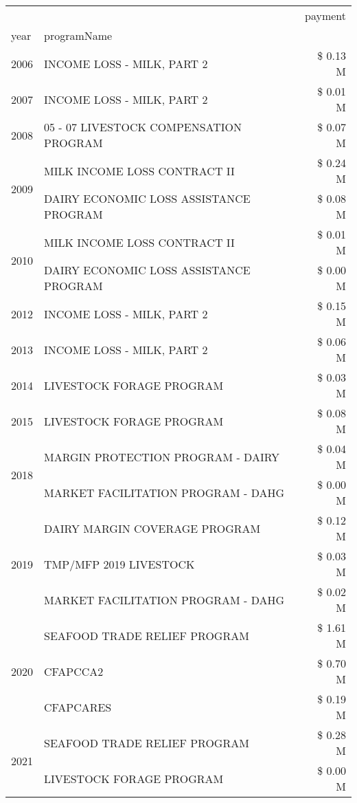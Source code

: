 \begin{tabular}{llr}
\toprule
 &  & payment \\
year & programName &  \\
\midrule
2006 & INCOME LOSS - MILK, PART 2 & \$ 0.13 M \\
\cline{1-3}
2007 & INCOME LOSS - MILK, PART 2 & \$ 0.01 M \\
\cline{1-3}
2008 & 05 - 07 LIVESTOCK COMPENSATION PROGRAM & \$ 0.07 M \\
\cline{1-3}
\multirow[t]{2}{*}{2009} & MILK INCOME LOSS CONTRACT II & \$ 0.24 M \\
 & DAIRY ECONOMIC LOSS ASSISTANCE PROGRAM & \$ 0.08 M \\
\cline{1-3}
\multirow[t]{2}{*}{2010} & MILK INCOME LOSS CONTRACT II & \$ 0.01 M \\
 & DAIRY ECONOMIC LOSS ASSISTANCE PROGRAM & \$ 0.00 M \\
\cline{1-3}
2012 & INCOME LOSS - MILK, PART 2 & \$ 0.15 M \\
\cline{1-3}
2013 & INCOME LOSS - MILK, PART 2 & \$ 0.06 M \\
\cline{1-3}
2014 & LIVESTOCK FORAGE PROGRAM & \$ 0.03 M \\
\cline{1-3}
2015 & LIVESTOCK FORAGE PROGRAM & \$ 0.08 M \\
\cline{1-3}
\multirow[t]{2}{*}{2018} & MARGIN PROTECTION PROGRAM - DAIRY & \$ 0.04 M \\
 & MARKET FACILITATION PROGRAM - DAHG & \$ 0.00 M \\
\cline{1-3}
\multirow[t]{3}{*}{2019} & DAIRY MARGIN COVERAGE PROGRAM & \$ 0.12 M \\
 & TMP/MFP 2019 LIVESTOCK & \$ 0.03 M \\
 & MARKET FACILITATION PROGRAM - DAHG & \$ 0.02 M \\
\cline{1-3}
\multirow[t]{3}{*}{2020} & SEAFOOD TRADE RELIEF PROGRAM & \$ 1.61 M \\
 & CFAPCCA2 & \$ 0.70 M \\
 & CFAPCARES & \$ 0.19 M \\
\cline{1-3}
\multirow[t]{2}{*}{2021} & SEAFOOD TRADE RELIEF PROGRAM & \$ 0.28 M \\
 & LIVESTOCK FORAGE PROGRAM & \$ 0.00 M \\
\cline{1-3}
\bottomrule
\end{tabular}
